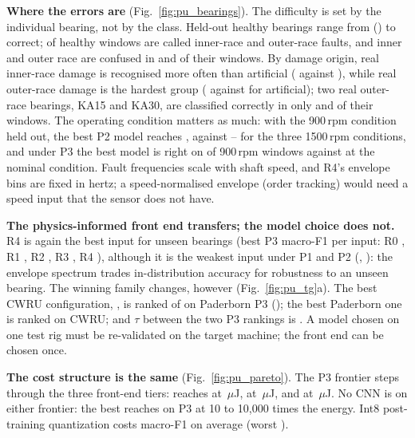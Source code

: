 \textbf{Where the errors are} (Fig.~\ref{fig:pu_bearings}). The difficulty is set by the individual bearing, not by
the class. Held-out healthy bearings range from \NumPuHealthyMin{} (\NumPuHealthyWorst{}) to \NumPuHealthyMax{}
correct; \NumPuConfNIr{} of healthy windows are called inner-race and \NumPuConfNOr{} outer-race faults, and inner
and outer race are confused in \NumPuConfIrOr{} and \NumPuConfOrIr{} of their windows. By damage origin, real
inner-race damage is recognised more often than artificial (\NumPuAccIrReal{} against \NumPuAccIrArt{}), while real
outer-race damage is the hardest group (\NumPuAccOrReal{} against \NumPuAccOrArt{} for artificial); two real
outer-race bearings, KA15 and KA30, are classified correctly in only \NumPuAccKAfifteen{} and \NumPuAccKAthirty{} of
their windows. The operating condition matters as much: with the 900\,rpm condition held out, the best P2 model
reaches \NumPuPTwoNineBest{}, against \NumPuPTwoOtherMin{}--\NumPuPTwoOtherMax{} for the three 1500\,rpm
conditions, and under P3 the best model is right on \NumPuCondNineAcc{} of 900\,rpm windows against
\NumPuCondFifteenAcc{} at the nominal condition. Fault frequencies scale with shaft speed, and R4's envelope bins are
fixed in hertz; a speed-normalised envelope (order tracking) would need a speed input that the sensor does not have.

\textbf{The physics-informed front end transfers; the model choice does not.} R4 is again the best input for unseen
bearings (best P3 macro-F1 per input: R0 \NumPuPThreeRepRZero{}, R1 \NumPuPThreeRepROne{}, R2 \NumPuPThreeRepRTwo{},
R3 \NumPuPThreeRepRThree{}, R4 \NumPuPThreeRepRFour{}), although it is the weakest input under P1 and P2
(\NumPuPOneRepRFour{}, \NumPuPTwoRepRFour{}): the envelope spectrum trades in-distribution accuracy for robustness to an
unseen bearing. The winning family changes, however (Fig.~\ref{fig:pu_tg}a). The best CWRU configuration,
\NumPuCwruBestModel{}, is ranked \NumPuCwruBestRank{} of \NumConfigs{} on Paderborn P3 (\NumPuCwruBestOnPu{}); the best
Paderborn one is ranked \NumPuBestRankCwru{} on CWRU; and $\tau$ between the two P3 rankings is
\NumPuTauCwruPThree{}. A model chosen on one test rig must be re-validated on the target machine; the front end can be
chosen once.



\textbf{The cost structure is the same} (Fig.~\ref{fig:pu_pareto}). The P3 frontier steps through the three
front-end tiers: \NumPuFrontROneModel{} reaches \NumPuFrontROneFOne{} at \NumPuFrontROneE{}\,$\mu$J,
\NumPuFrontRTwoModel{} \NumPuFrontRTwoFOne{} at \NumPuFrontRTwoE{}\,$\mu$J, and \NumPuFrontRFourModel{}
\NumPuFrontRFourFOne{} at \NumPuFrontRFourE{}\,$\mu$J. No CNN is on either frontier: the best reaches
\NumPuPThreeCnn{} on P3 at 10 to 10,000 times the energy. Int8 post-training quantization costs \NumPuIntEightMean{}
macro-F1 on average (worst \NumPuIntEightWorst{}).


